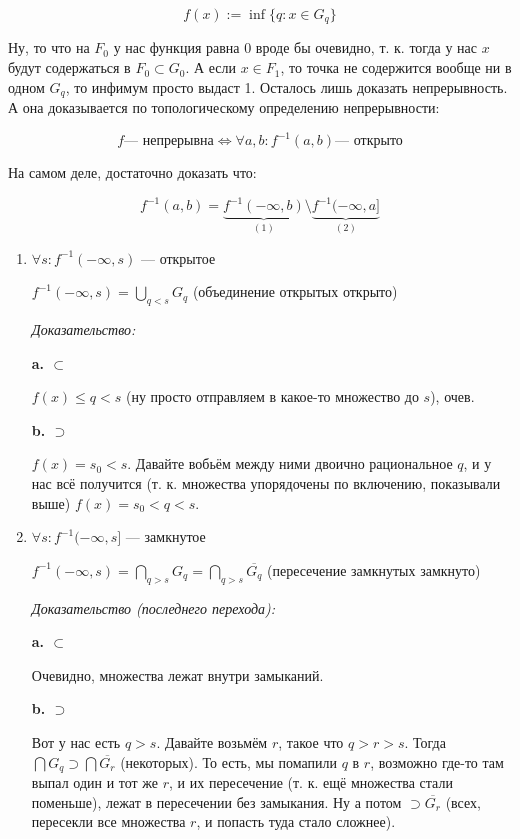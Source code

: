 \documentclass{article}
\begin{document}
\[f(x) := \inf \{q: x \in G_q\}\]

Ну, то что на $F_0$ у нас функция равна 0 вроде бы очевидно, т. к. тогда у нас $x$ будут содержаться в $F_0 \subset G_0$. А если $x \in F_1$, то точка не содержится вообще ни в одном $G_q$, то инфимум просто выдаст 1. Осталось лишь доказать непрерывность. А она доказывается по топологическому определению непрерывности:

\[f \text{--- непрерывна} \Leftrightarrow \forall a, b:  f^{-1}(a, b) \text{--- открыто}\]

На самом деле, достаточно доказать что: 

\[f^{-1}(a, b) = \underbrace{f^{-1}(-\infty, b)}_{(1)} \setminus \underbrace{f^{-1}(-\infty, a]}_{(2)}\]

\begin{enumerate}
    \item $\forall s: f^{-1}(-\infty, s)$ --- открытое
    
    $f^{-1}(-\infty, s) = \bigcup_{q < s} G_q$ (объединение открытых открыто)

    \textit{Доказательство:}
    
    \textbf{a. $\subset$}
    
    $f(x) \le q < s$ (ну просто отправляем в какое-то множество до $s$), очев.

    \textbf{b. $\supset$}

    $f(x) = s_0 < s$. Давайте вобьём между ними двоично рациональное $q$, и у нас всё получится (т. к. множества упорядочены по включению, показывали выше) $f(x) = s_0 < q < s$.

    \item $\forall s: f^{-1}(-\infty, s]$ --- замкнутое
    
    $f^{-1}(-\infty, s) = \bigcap_{q > s} G_q = \bigcap_{q > s} \overline{G_q}$ (пересечение замкнутых замкнуто)

    \textit{Доказательство (последнего перехода):}
    
    \textbf{a. $\subset$}
    
    Очевидно, множества лежат внутри замыканий.

    \textbf{b. $\supset$}

    Вот у нас есть $q > s$. Давайте возьмём $r$, такое что $q > r > s$. Тогда $\bigcap G_q \supset \bigcap \overline{G_r}$ (некоторых). То есть, мы помапили $q$ в $r$, возможно где-то там выпал один и тот же $r$, и их пересечение (т. к. ещё множества стали поменьше), лежат в пересечении без замыкания. Ну а потом $\supset \overline{G_r}$ (всех, пересекли все множества $r$, и попасть туда стало сложнее).
\end{enumerate}
\end{document}
